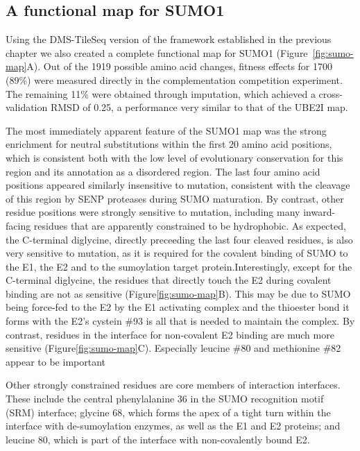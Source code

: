 \subsection{A functional map for SUMO1}

Using the DMS-TileSeq version of the framework established in the previous chapter we also created a complete functional map for SUMO1 (Figure~\ref{fig:sumo-map}A). Out of the 1919 possible amino acid changes, fitness effects for 1700 (89\%) were measured directly in the complementation competition experiment. The remaining 11\% were obtained through imputation, which achieved a cross-validation RMSD of 0.25, a performance very similar to that of the UBE2I map.

The most immediately apparent feature of the SUMO1 map was the strong enrichment for neutral substitutions within the first 20 amino acid positions, which is consistent both with the low level of evolutionary conservation for this region and its annotation as a disordered region. The last four amino acid positions appeared similarly insensitive to mutation, consistent with the cleavage of this region by SENP proteases during SUMO maturation. By contrast, other residue positions were strongly sensitive to mutation, including many inward-facing residues that are apparently constrained to be hydrophobic. As expected, the C-terminal diglycine, directly preceeding the last four cleaved residues, is also very sensitive to mutation, as it is required for the covalent binding of SUMO to the E1, the E2 and to the sumoylation target protein.Interestingly, except for the C-terminal diglycine, the residues that directly touch the E2 during covalent binding are not as sensitive (Figure\ref{fig:sumo-map}B). This may be due to  SUMO being force-fed to the E2 by the E1 activating complex and the thioester bond it forms with the E2's cystein \#93 is all that is needed to maintain the complex. By contrast, residues in the interface for non-covalent E2 binding are much more sensitive (Figure\ref{fig:sumo-map}C). Especially leucine \#80 and methionine \#82 appear to be important

Other strongly constrained residues are core members of interaction interfaces. These include the central phenylalanine 36 in the SUMO recognition motif (SRM) interface; glycine 68, which forms the apex of a tight turn within the interface with de-sumoylation enzymes, as well as the E1 and E2 proteins; and leucine 80, which is part of the interface with non-covalently bound E2. 

